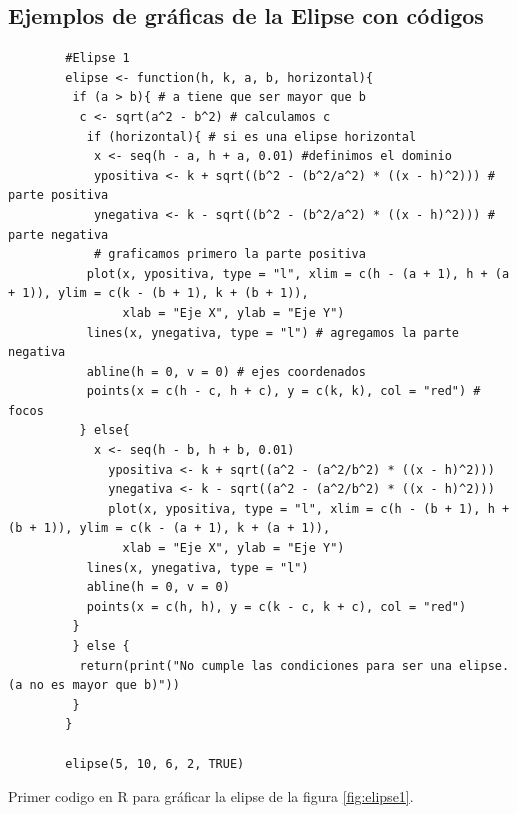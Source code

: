 \documentclass[12pt,a4paper]{article}
\begin{document}
\subsection{Ejemplos de gráficas de la Elipse con códigos} \label{subsec:EEL}
\begin{table}[htpb]
	\begin{lstlisting}
		#Elipse 1
		elipse <- function(h, k, a, b, horizontal){
 		 if (a > b){ # a tiene que ser mayor que b
  		  c <- sqrt(a^2 - b^2) # calculamos c
 		   if (horizontal){ # si es una elipse horizontal
  		    x <- seq(h - a, h + a, 0.01) #definimos el dominio
  		    ypositiva <- k + sqrt((b^2 - (b^2/a^2) * ((x - h)^2))) # parte positiva
  		    ynegativa <- k - sqrt((b^2 - (b^2/a^2) * ((x - h)^2))) # parte negativa
  		    # graficamos primero la parte positiva
   		   plot(x, ypositiva, type = "l", xlim = c(h - (a + 1), h + (a + 1)), ylim = c(k - (b + 1), k + (b + 1)),
   		        xlab = "Eje X", ylab = "Eje Y")
   		   lines(x, ynegativa, type = "l") # agregamos la parte negativa
   		   abline(h = 0, v = 0) # ejes coordenados
   		   points(x = c(h - c, h + c), y = c(k, k), col = "red") # focos
  		  } else{
  		    x <- seq(h - b, h + b, 0.01)
    		  ypositiva <- k + sqrt((a^2 - (a^2/b^2) * ((x - h)^2)))
    		  ynegativa <- k - sqrt((a^2 - (a^2/b^2) * ((x - h)^2)))
    		  plot(x, ypositiva, type = "l", xlim = c(h - (b + 1), h + (b + 1)), ylim = c(k - (a + 1), k + (a + 1)),
   		        xlab = "Eje X", ylab = "Eje Y")
   		   lines(x, ynegativa, type = "l")
   		   abline(h = 0, v = 0)
   		   points(x = c(h, h), y = c(k - c, k + c), col = "red")
   		 }
 		 } else {
  		  return(print("No cumple las condiciones para ser una elipse. (a no es mayor que b)"))
 		 }
		}
	
		elipse(5, 10, 6, 2, TRUE)
	\end{lstlisting}
	\caption{Primer codigo en R para gráficar la elipse de la figura \ref{fig:elipse1}.}
	\label{alg:eli1}
\end{table}
\end{document}
